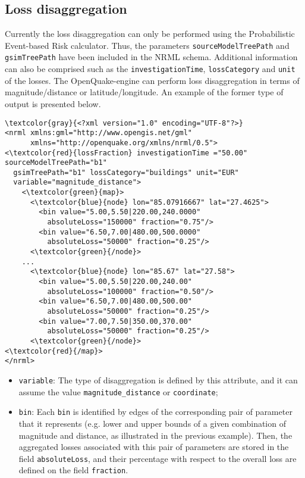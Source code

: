 \subsection{Loss disaggregation}

Currently the loss disaggregation can only be performed using the
Probabilistic Event-based Risk calculator. Thus, the parameters
\Verb+sourceModelTreePath+ and \Verb+gsimTreePath+ have been included in the
NRML schema. Additional information can also be comprised such as the
\Verb+investigationTime+, \Verb+lossCategory+ and \Verb+unit+ of the losses.
The OpenQuake-engine can perform loss disaggregation in terms of
magnitude/distance or latitude/longitude. An example of the former type of
output is presented below.

\begin{Verbatim}[frame=single, commandchars=\\\{\}, samepage=false]
\textcolor{gray}{<?xml version="1.0" encoding="UTF-8"?>}
<nrml xmlns:gml="http://www.opengis.net/gml"
      xmlns="http://openquake.org/xmlns/nrml/0.5">
<\textcolor{red}{lossFraction} investigationTime ="50.00" sourceModelTreePath="b1"
  gsimTreePath="b1" lossCategory="buildings" unit="EUR"
  variable="magnitude_distance">
    <\textcolor{green}{map}>
      <\textcolor{blue}{node} lon="85.07916667" lat="27.4625">
        <bin value="5.00,5.50|220.00,240.0000"
          absoluteLoss="150000" fraction="0.75"/>
        <bin value="6.50,7.00|480.00,500.0000"
          absoluteLoss="50000" fraction="0.25"/>
      <\textcolor{green}{/node}>
    ...
      <\textcolor{blue}{node} lon="85.67" lat="27.58">
        <bin value="5.00,5.50|220.00,240.00"
          absoluteLoss="100000" fraction="0.50"/>
        <bin value="6.50,7.00|480.00,500.00"
          absoluteLoss="50000" fraction="0.25"/>
        <bin value="7.00,7.50|350.00,370.00"
          absoluteLoss="50000" fraction="0.25"/>
      <\textcolor{green}{/node}>
<\textcolor{red}{/map}>
</nrml>
\end{Verbatim}

\begin{itemize}
\item  \Verb+variable+: The type of disaggregation is defined by this attribute, and it can assume the value \Verb+magnitude_distance+ or \Verb+coordinate+;
\item  \Verb+bin+: Each \Verb+bin+ is identified by edges of the corresponding pair of parameter that it represents (e.g. lower and upper bounds of a given combination of magnitude and distance, as illustrated in the previous example). Then, the aggregated losses associated with this pair of parameters are stored in the field \Verb+absoluteLoss+, and their percentage with respect to the overall loss are defined on the field \Verb+fraction+.
\end{itemize}

